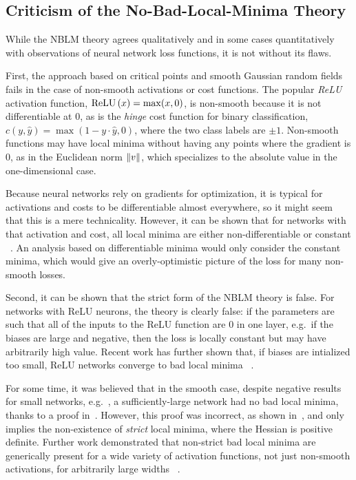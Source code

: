 \documentclass[../../thesis.tex]{subfiles}
\begin{document}
\subsection{Criticism of the No-Bad-Local-Minima Theory}

While the NBLM theory agrees qualitatively and in some cases quantitatively
with observations of neural network loss functions,
it is not without its flaws.

First, the approach based on critical points
and smooth Gaussian random fields fails
in the case of non-smooth activations or cost functions.
The popular \emph{ReLU} activation function,
$\mathrm{ReLU}\left(x\right) = \max(x, 0)$,
is non-smooth because it is not differentiable at $0$,
as is the \emph{hinge} cost function for binary classification,
$c(y, \hat{y}) = \max(1-y\cdot\hat{y}, 0)$,
where the two class labels are $\pm 1$.
Non-smooth functions may have local minima
without having any points where the gradient is $0$,
as in the Euclidean norm $\lVert v\rVert$,
which specializes to the absolute value in the one-dimensional case.

Because neural networks rely on gradients for optimization,
it is typical for activations and costs
to be differentiable almost everywhere,
so it might seem that this is a mere technicality.
However, it can be shown that for networks
with that activation and cost,
all local minima are either non-differentiable or constant%
~\cite{laurent2017}.
An analysis based on differentiable minima would only
consider the constant minima,
which would give an overly-optimistic picture
of the loss for many non-smooth losses.

Second,
it can be shown that the strict form of the NBLM theory is false.
For networks with ReLU neurons, the theory is clearly false:
if the parameters are such that all of the inputs to the
ReLU function are $0$ in one layer,
e.g.~if the biases are large and negative,
then the loss is locally constant
but may have arbitrarily high value.
Recent work has further shown that,
if biases are intialized too small,
ReLU networks converge to bad local minima%
~\cite{holzmller2020}.

For some time, it was believed that in the smooth case,
despite negative results for small networks,
e.g.~\cite{auer1996},
a sufficiently-large network had
no bad local minima,
thanks to a proof in~\cite{yu1995}.
However, this proof was incorrect,
as shown in~\cite{li2018},
and only implies the non-existence of
\emph{strict} local minima,
where the Hessian is positive definite.
Further work demonstrated that non-strict bad local minima
are generically present for a wide variety of activation functions,
not just non-smooth activations,
for arbitrarily large widths%
~\cite{ding2019}.
\end{document}
